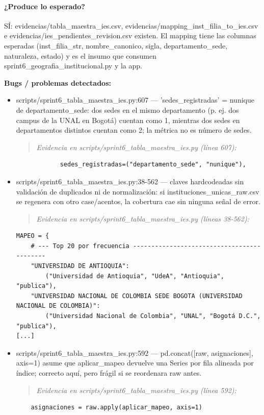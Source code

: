 \paragraph{¿Produce lo esperado?}
SÍ: evidencias/tabla\_maestra\_ies.csv, evidencias/mapping\_inst\_filia\_to\_ies.csv e evidencias/ies\_pendientes\_revision.csv existen. El mapping tiene las columnas esperadas (inst\_filia\_str, nombre\_canonico, sigla, departamento\_sede, naturaleza, estado) y es el insumo que consumen sprint6\_geografia\_institucional.py y la app.

\begin{tcolorbox}[riesgo]
\textbf{Bugs / problemas detectados:}
\begin{itemize}
  \item scripts/sprint6\_tabla\_maestra\_ies.py:607 --- 'sedes\_registradas' = nunique de departamento\_sede: dos sedes en el mismo departamento (p. ej. dos campus de la UNAL en Bogotá) cuentan como 1, mientras dos sedes en departamentos distintos cuentan como 2; la métrica no es número de sedes.
\begin{quote}\footnotesize\ttfamily
\noindent\emph{Evidencia en scripts/sprint6\_tabla\_maestra\_ies.py (línea 607):}
\end{quote}
\begin{lstlisting}
            sedes_registradas=("departamento_sede", "nunique"),
\end{lstlisting}

  \item scripts/sprint6\_tabla\_maestra\_ies.py:38-562 --- claves hardcodeadas sin validación de duplicados ni de normalización: si instituciones\_unicas\_raw.csv se regenera con otro case/acentos, la cobertura cae sin ninguna señal de error.
\begin{quote}\footnotesize\ttfamily
\noindent\emph{Evidencia en scripts/sprint6\_tabla\_maestra\_ies.py (líneas 38-562):}
\end{quote}
\begin{lstlisting}
MAPEO = {
    # --- Top 20 por frecuencia -------------------------------------------
    "UNIVERSIDAD DE ANTIOQUIA":
        ("Universidad de Antioquia", "UdeA", "Antioquia", "publica"),
    "UNIVERSIDAD NACIONAL DE COLOMBIA SEDE BOGOTA (UNIVERSIDAD NACIONAL DE COLOMBIA)":
        ("Universidad Nacional de Colombia", "UNAL", "Bogotá D.C.", "publica"),
[...]
\end{lstlisting}

  \item scripts/sprint6\_tabla\_maestra\_ies.py:592 --- pd.concat([raw, asignaciones], axis=1) asume que aplicar\_mapeo devuelve una Series por fila alineada por índice; correcto aquí, pero frágil si se reordenara raw antes.
\begin{quote}\footnotesize\ttfamily
\noindent\emph{Evidencia en scripts/sprint6\_tabla\_maestra\_ies.py (línea 592):}
\end{quote}
\begin{lstlisting}
    asignaciones = raw.apply(aplicar_mapeo, axis=1)
\end{lstlisting}


\end{itemize}
\end{tcolorbox}
